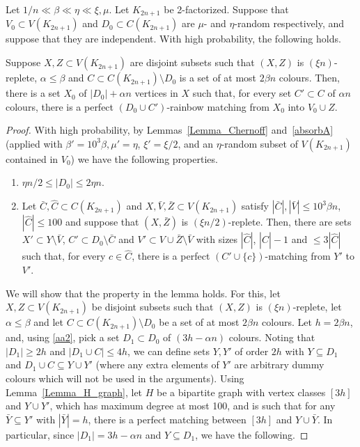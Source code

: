 \begin{lemma}\label{absorbAmacro} Let $1/n\ll \beta \ll \eta\ll \xi,\mu$. Let $K_{2n+1}$ be 2-factorized. Suppose that $V_0\subset V(K_{2n+1})$ and $D_0\subset C(K_{2n+1})$ are $\mu$- and $\eta$-random respectively, and suppose that they are independent. With high probability, the following holds.

Suppose $X,Z\subset V(K_{2n+1})$ are disjoint subsets such that $(X,Z)$ is $(\xi n)$-replete, $\alpha\leq \beta$ and $C\subset C(K_{2n+1})\setminus D_0$ is a set of at most $2\beta n$ colours. Then, there is a set $X_0$ of $|D_0|+\alpha n$ vertices in $X$ such that, for every set $C'\subset C$ of $\alpha n$ colours, there is a perfect $(D_0\cup C')$-rainbow matching from $X_0$ into $V_0\cup Z$.
\end{lemma}
\begin{proof}
With high probability, by Lemmas~\ref{Lemma_Chernoff} and~\ref{absorbA} (applied with $\beta'=10^3\beta, \mu'=\eta$, $\xi'=\xi/2$, and an $\eta$-random subset of $V(K_{2n+1})$ contained in $V_0$) we have the following properties.
\begin{enumerate}[label = {\bfseries \Alph{propcounter}\arabic{enumi}}]
\item $\eta n/2\leq |D_0|\leq 2\eta n$.\label{aa2}
\item Let $\bar{C},\hat{C}\subset C(K_{2n+1})$ and $X,\bar{V},\bar{Z}\subset V(K_{2n+1})$ satisfy $|\bar{{C}}|,|\bar{V}|\leq 10^3\beta n$, $|\hat{C}|\leq 100$ and suppose that $(X,\bar{Z})$ is $(\xi n/2)$-replete.
Then, there are sets $X'\subset Y\setminus \bar{V}$, $C'\subset D_0\setminus \bar{C}$ and $V'\subset V\cup \bar Z \setminus \bar{V}$ with sizes $|\hat{C}|$, $|\hat{C}|-1$ and $\leq 3|\hat{C}|$ such that, for every $c\in \hat{C}$, there is a perfect $(C'\cup \{c\})$-matching from $Y'$ to $V'$.\label{aa3}
\end{enumerate}

We will show that the property in the lemma holds. For this, let $X,Z\subset V(K_{2n+1})$ be disjoint subsets such that $(X,Z)$ is $(\xi n)$-replete, let $\alpha\leq \beta$ and let $C\subset C(K_{2n+1})\setminus D_0$ be a set of at most $2\beta n$ colours.
Let $h=2\beta n$, and, using \ref{aa2}, pick a set $D_1\subset D_0$ of $(3h-\alpha n)$ colours. 
Noting that $|D_1|\geq 2h$ and $|D_1\cup C|\leq 4h$, we can define sets $Y,Y'$ of order $2h$ with $Y\subseteq D_1$ and $D_1\cup C\subseteq Y\cup Y'$ (where any extra elements of $Y'$ are arbitrary dummy colours which will not be used in the arguments).
Using Lemma~\ref{Lemma_H_graph}, let $H$ be a bipartite graph with vertex classes $[3h]$ and $Y\cup Y'$, which has maximum degree at most 100, and is such that for any $\bar{Y}\subseteq Y'$ with $|\bar{Y}|=h$, there is a perfect matching between $[3h]$ and $Y\cup \bar{Y}$. In particular, since $|D_1|=3h-\alpha n$ and $Y\subseteq D_1$, we have the following.


\end{proof}
